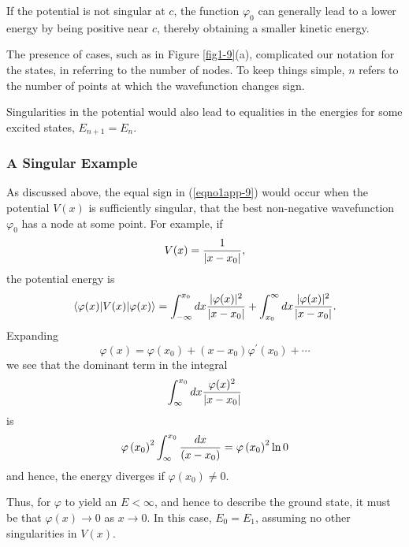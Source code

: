 If the potential is not singular at $c$, the function $\varphi_0$ can 
generally lead to a lower energy by being positive near $c$, thereby 
obtaining a smaller kinetic energy.
    
The presence of cases, such as in Figure \ref{fig1-9}(a), complicated
our notation for the states, in referring to the number of nodes. To
keep things simple, $n$ refers to the number of points at which the
wavefunction changes sign.
    
Singularities in the potential would also lead to equalities in the energies for some
excited states, $E_{n+1} = E_n$.

\subsubsection{A Singular Example}
    
As discussed above, the equal sign in (\ref{eqno1app-9}) would occur
when the potential $V(x)$ is sufficiently singular, that the best
non-negative wavefunction $\varphi_0$ has a node at some point.  For
example, if
\begin{equation}
V ( x ) = {1 \over \vert x - x_0 \vert},
\end{equation}
the potential energy is
\begin{equation}
\langle \varphi (x) \vert V ( x ) \vert \varphi ( x ) \rangle = 
\int^{x_0}_{- \infty} d x {\vert \varphi ( x ) \vert^2 \over 
\vert x - x_0 \vert} + \int^{\infty}_{x_0} d x 
{\vert \varphi ( x ) \vert^2 \over 
\vert x - x_0 \vert} .
\end{equation}
Expanding 
\begin{equation}
\varphi (x) = \varphi (x_0) + ( x - x_0 ) \varphi^{\prime}(x_0) + \cdots
\end{equation}
we see that the dominant term in the integral
\begin{equation}
\int^{x_0}_\infty dx {\varphi (x)^2 \over \vert x - x_0 \vert} 
\end{equation}
is
\begin{equation}
\varphi \left( x_0 \right)^2 \int^{x_0}_\infty {dx \over ( x - 
x_0)} = \varphi \left( x_0 \right)^2 \ln 0
\end{equation}
and hence, the energy diverges if $\varphi ( x_0 ) \not= 0$.

Thus, for $\varphi$ to yield an $E < \infty$, and hence to describe
the ground state, it must be that $\varphi (x) \rightarrow 0$ as $x
\rightarrow 0$.  In this case, $E_0 = E_1$, assuming no other
singularities in $V(x)$.

